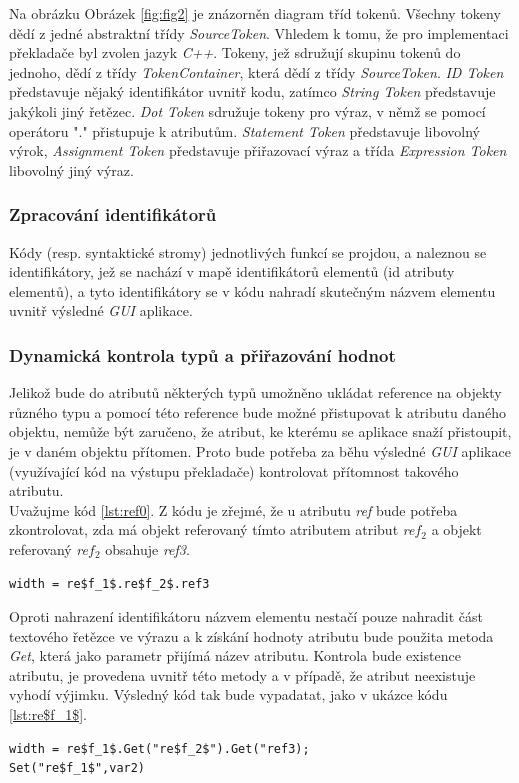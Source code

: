 \documentclass[11pt,twoside,a4paper]{book}
\begin{document}
{{\begin{ttemize}
{{Na obrázku Obrázek \ref{fig:fig2} je znázorněn diagram tříd tokenů. Všechny tokeny dědí z jedné abstraktní třídy \textit{SourceToken}. Vhledem k tomu, že pro implementaci překladače byl zvolen jazyk \textit{C++}. Tokeny, jež sdružují skupinu tokenů do jednoho, dědí z třídy \textit{TokenContainer}, která dědí z třídy \textit{SourceToken}. \textit{ID Token} představuje nějaký identifikátor uvnitř kodu, zatímco \textit{String Token} představuje jakýkoli jiný řetězec. \textit{Dot Token} sdružuje tokeny pro výraz, v němž se pomocí operátoru "." přistupuje k atributům. \textit{Statement Token} představuje libovolný výrok, \textit{Assignment Token} představuje přiřazovací výraz a třída \textit{Expression Token} libovolný jiný výraz.

\subsubsection{Zpracování identifikátorů}
Kódy (resp. syntaktické stromy) jednotlivých funkcí se projdou, a naleznou se identifikátory, jež se nachází v mapě identifikátorů elementů (id atributy elementů), a tyto identifikátory se v kódu nahradí skutečným názvem elementu uvnitř výsledné \textit{GUI} aplikace.
\subsubsection{Dynamická kontrola typů a přiřazování hodnot}
Jelikož bude do atributů některých typů umožněno ukládat reference na objekty různého typu a pomocí této reference bude možné přistupovat k atributu daného objektu, nemůže být zaručeno, že atribut, ke kterému se aplikace snaží přistoupit, je v daném objektu přítomen. Proto bude potřeba za běhu výsledné \textit{GUI} aplikace (využívající kód na výstupu překladače) kontrolovat přítomnost takového atributu.\\
Uvažujme kód \ref{lst:ref0}. Z kódu je zřejmé, že u atributu \textit{ref} bude potřeba zkontrolovat, zda má objekt referovaný tímto atributem atribut \textit{re$f_2$} a objekt referovaný \textit{re$f_2$} obsahuje \textit{ref3}.

\begin{lstlisting}[frame=single,caption=Pseudokód problematického použití operátoru "." v přiřazovacím výroku. \label{lst:ref0}]
width = re$f_1$.re$f_2$.ref3
\end{lstlisting}
Oproti nahrazení identifikátoru názvem elementu nestačí pouze nahradit část textového řetězce ve výrazu a k získání hodnoty atributu bude použita metoda \textit{Get}, která jako parametr přijímá název atributu. Kontrola bude existence atributu, je provedena uvnitř této metody a v případě, že atribut neexistuje vyhodí výjimku. Výsledný kód tak bude vypadatat, jako v ukázce kódu \ref{lst:re$f_1$}.
\begin{lstlisting}[frame=single,caption=Řešení v pseudokódu problematického použití operátoru "." v přiřazovacím výroku. \label{lst:re$f_1$}]
width = re$f_1$.Get("re$f_2$").Get("ref3);
Set("re$f_1$",var2)
\end{lstlisting}


}}
\end{ttemize}}}
\end{document}
